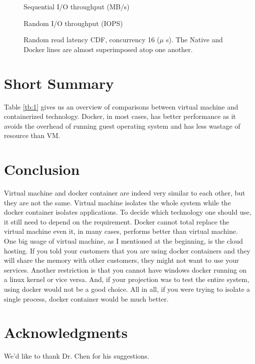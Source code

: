 \documentclass{sig-alternate}
\begin{document}
\begin{figure}[htb]
\centering
{}
\caption{Sequential I/O throughput (MB/s)\cite{vdcp:fel}}
\label{fig:io_seq}
\vskip -6pt
\end{figure}

\begin{figure}[htb]
\centering
{}
\caption{Random I/O throughput (IOPS)\cite{vdcp:fel}}
\label{fig:io_rd}
\vskip -6pt
\end{figure}

\begin{figure}[htb]
\centering
{}
\caption{Random read latency CDF, concurrency 16 ($\mu$ s). The Native and Docker lines are almost superimposed atop one another.\cite{vdcp:fel}}
\label{fig:rd_read}
\vskip -6pt
\end{figure}

\section{Short Summary}
Table \ref{tb:1} gives us an overview of comparisons between virtual machine and containerized technology. Docker, in most cases, has better performance as it avoids the overhead of running guest operating system and has less wastage of resource than VM.

\section{Conclusion}
Virtual machine and docker container are indeed very similar to each other, but they are not the same. Virtual machine isolates the whole system while the docker container isolates applications. To decide which technology one should use, it still need to depend on the requirement. Docker cannot total replace the virtual machine even it, in many cases, performs better than virtual machine. One big usage of virtual machine, as I mentioned at the beginning, is the cloud hosting. If you told your customers that you are using docker containers and they will share the memory with other customers, they might not want to use your services. Another restriction is that you cannot have windows docker running on a linux kernel or vice versa. And, if your projection was to test the entire system, using docker would not be a good choice. All in all, if you were trying to isolate a single process, docker container would be much better.

\section{Acknowledgments} 
We'd like to thank Dr. Chen for his suggestions.
%

%
%
\end{document}
